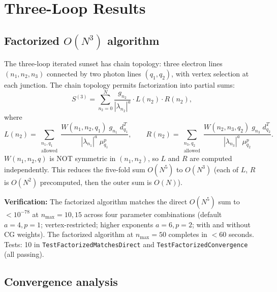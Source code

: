 \documentclass[11pt]{article}
\begin{document}
\section{Three-Loop Results}
\label{sec:three_loop}

\subsection{Factorized $O(N^3)$ algorithm}

The three-loop iterated sunset has chain topology: three electron
lines $(n_1, n_2, n_3)$ connected by two photon lines $(q_1, q_2)$,
with vertex selection at each junction.  The chain topology permits
factorization into partial sums:
\begin{equation}
  S^{(3)} = \sum_{n_2=0}^{N}
    \frac{g_{n_2}}{|\lambda_{n_2}|^a}
    \cdot L(n_2) \cdot R(n_2),
  \label{eq:three_loop_factorized}
\end{equation}
where
\begin{equation}
  L(n_2) = \sum_{\substack{n_1, q_1 \\ \text{allowed}}}
    \frac{W(n_1, n_2, q_1) \; g_{n_1} \; d_{q_1}^T}
         {|\lambda_{n_1}|^a \; \mu_{q_1}^p}, \qquad
  R(n_2) = \sum_{\substack{n_3, q_2 \\ \text{allowed}}}
    \frac{W(n_2, n_3, q_2) \; g_{n_3} \; d_{q_2}^T}
         {|\lambda_{n_3}|^a \; \mu_{q_2}^p}.
  \label{eq:LR_partial}
\end{equation}
$W(n_1, n_2, q)$ is NOT symmetric in $(n_1, n_2)$, so $L$ and $R$
are computed independently.  This reduces the five-fold sum
$O(N^5)$ to $O(N^3)$ (each of $L$, $R$ is $O(N^2)$ precomputed,
then the outer sum is $O(N)$).

\noindent\textbf{Verification:} The factorized algorithm matches the
direct $O(N^5)$ sum to $< 10^{-78}$ at $n_{\max} = 10, 15$ across
four parameter combinations (default $a=4,p=1$; vertex-restricted;
higher exponents $a=6,p=2$; with and without CG weights).  The
factorized algorithm at $n_{\max} = 50$ completes in $< 60$ seconds.
Tests: 10 in \texttt{TestFactorizedMatchesDirect} and
\texttt{TestFactorizedConvergence} (all passing).

\subsection{Convergence analysis}
\end{document}
